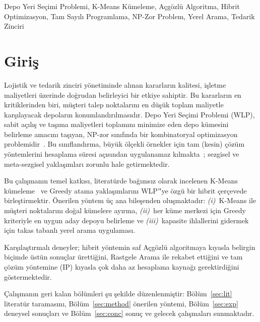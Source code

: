\documentclass[conference]{IEEEtran}
\begin{document}
\begin{IEEEkeywords}
Depo Yeri Se\c{c}imi Problemi, K-Means K\"{u}meleme, A\c{c}g\"{o}zl\"{u}
Algoritma, Hibrit Optimizasyon, Tam Say{\i}l{\i} Programlama, NP-Zor Problem,
Yerel Arama, Tedarik Zinciri
\end{IEEEkeywords}

\section{Giri\c{s}}

Lojistik ve tedarik zinciri y\"{o}netiminde al{\i}nan kararlar{\i}n kalitesi,
i\c{s}letme maliyetleri \"{u}zerinde do\u{g}rudan belirleyici bir etkiye
sahiptir.
Bu kararlar{\i}n en kritiklerinden biri, m\"{u}\c{s}teri talep noktalar{\i}n{\i}
en d\"{u}\c{s}\"{u}k toplam maliyetle kar\c{s}{\i}layacak depolar{\i}n
konumland{\i}r{\i}lmas{\i}d{\i}r.
Depo Yeri Se\c{c}imi Problemi (WLP), sabit a\c{c}{\i}l{\i}\c{s} ve ta\c{s}{\i}ma
maliyetleri toplam{\i}n{\i} minimize eden depo k\"{u}mesini belirleme
amac{\i}n{\i} ta\c{s}{\i}yan, NP-zor s{\i}n{\i}f{\i}nda bir kombinatoryal
optimizasyon problemidir~\cite{cornuejols1977}.
Bu s{\i}n{\i}fland{\i}rma, b\"{u}y\"{u}k \"{o}l\c{c}ekli \"{o}rnekler
i\c{c}in tam (kesin) \c{c}\"{o}z\"{u}m y\"{o}ntemlerini hesaplama
s\"{u}resi a\c{c}{\i}s{\i}ndan uygulanamaz k{\i}lmakta~\cite{garey1979};
sezgisel ve meta-sezgisel yakla\c{s}{\i}mlar{\i} zorunlu hale getirmektedir.

Bu \c{c}al{\i}\c{s}man{\i}n temel katk{\i}s{\i}, literat\"{u}rde
ba\u{g}{\i}ms{\i}z olarak incelenen K-Means k\"{u}meleme~\cite{lloyd1982}
ve Greedy atama yakla\c{s}{\i}mlar{\i}n{\i} WLP'\''ye \"{o}zg\"{u} bir
hibrit \c{c}er\c{c}evede birle\c{s}tirmektir.
\"{O}nerilen y\"{o}ntem \"{u}\c{c} ana bile\c{s}enden olu\c{s}maktad{\i}r:
\textit{(i)}~K-Means ile m\"{u}\c{s}teri noktalar{\i}n{\i} do\u{g}al
k\"{u}melere ay{\i}rma,
\textit{(ii)}~her k\"{u}me merkezi i\c{c}in Greedy kriteriyle en uygun
aday depoyu belirleme ve
\textit{(iii)}~kapasite ihlallerini gidermek i\c{c}in takas tabanl{\i}
yerel arama uygulamas{\i}.

Kar\c{s}{\i}la\c{s}t{\i}rmal{\i} deneyler; hibrit y\"{o}ntemin saf
A\c{c}g\"{o}zl\"{u} algoritmaya k{\i}yasla belirgin bi\c{c}imde \"{u}st\"{u}n
sonu\c{c}lar \"{u}retti\u{g}ini, Rastgele Arama ile rekabet etti\u{g}ini
ve tam \c{c}\"{o}z\"{u}m y\"{o}ntemine (IP) k{\i}yasla \c{c}ok daha az
hesaplama kayna\u{g}{\i} gerektirdi\u{g}ini g\"{o}stermektedir.

\c{C}al{\i}\c{s}man{\i}n geri kalan b\"{o}l\"{u}mleri \c{s}u \c{s}ekilde
d\"{u}zenlenmi\c{s}tir:
B\"{o}l\"{u}m~\ref{sec:lit} literat\"{u}r taramas{\i}n{\i},
B\"{o}l\"{u}m~\ref{sec:method} \"{o}nerilen y\"{o}ntemi,
B\"{o}l\"{u}m~\ref{sec:exp} deneysel sonu\c{c}lar{\i} ve
B\"{o}l\"{u}m~\ref{sec:conc} sonu\c{c} ve gelecek \c{c}al{\i}\c{s}malar{\i}
sunmaktad{\i}r.
\end{document}
